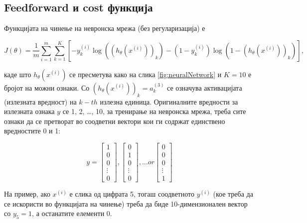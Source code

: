 


\subsection{Feedforward и cost функција}

Функцијата на чинење на невронска мрежа (без регуларизација) е

\[
	J(\theta) = \frac{1}{m}\sum_{i = 1}^{m}\sum_{k =
	1}^{K}[-y^{(i)}_k\log((h_\theta(x^{(i)}))_k) -
	(1 - y^{(i)}_k)\log(1 - (h_\theta(x^{(i)}))_k)],
\]

каде што $h_\theta(x^{(i)})$ се пресметува како на слика \ref{fig:neuralNetwork}
 и $K = 10$ е бројот на можни ознаки. Со $(h_\theta(x^{(i)}))_k = a^{(3)}_k$ се
 означува активацијата (излезната вредност) на $k-th$ излезна единица.
 Оригиналните вредности за излезната ознака $y$ се 1, 2, \ldots, 10, за
 тренирање на невронска мрежа, треба сите ознаки да се претворат во соодветни
 вектори кои ги содржат единствено вредностите 0 и 1:
 
 \[	
	y = \begin{bmatrix}
		    1 \\
			0 \\
			0 \\
			\vdots \\
			0
			
		\end{bmatrix},
		\begin{bmatrix}
		    0 \\
			1 \\
			0 \\
			\vdots \\
			0
			
		\end{bmatrix},
		\ldots
		or
		\begin{bmatrix}
		    0 \\
			0 \\
			0 \\
			\vdots \\
			1
			
		\end{bmatrix}
 \]

На пример, ако $x^{(i)}$ е слика од цифрата 5, тогаш соодветното $y^{(i)}$ (кое
треба да се искористи во функцијата на чинење) треба да биде 10-димензионален вектор
со $y_5 = 1$, а останатите елементи 0.



